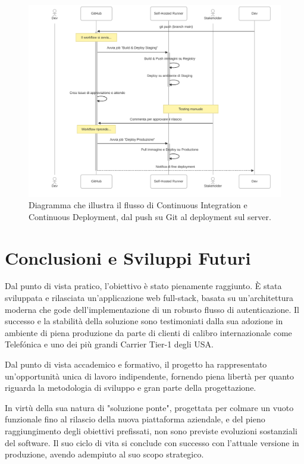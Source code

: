 \documentclass[12pt,a4paper,openright,twoside]{book}
\begin{document}
\begin{figure}[htbp]
    \centering
    \includegraphics[width=\textwidth]{figures/pipeline_sequence.pdf}
    \caption{Diagramma che illustra il flusso di Continuous Integration e Continuous Deployment, dal push su Git al deployment sul server.}
    \label{fig:ci_cd_diagram}
\end{figure}
\FloatBarrier


\chapter{Conclusioni e Sviluppi Futuri}
\label{chap:conclusioni}

Dal punto di vista pratico, l'obiettivo è stato pienamente raggiunto. È stata sviluppata e rilasciata un'applicazione web full-stack, basata su un'architettura moderna che gode dell'implementazione di un robusto flusso di autenticazione. Il successo e la stabilità della soluzione sono testimoniati dalla sua adozione in ambiente di piena produzione da parte di clienti di calibro internazionale come Telefónica e uno dei più grandi Carrier Tier-1 degli USA.

Dal punto di vista accademico e formativo, il progetto ha rappresentato un'opportunità unica di lavoro indipendente, fornendo piena libertà per quanto riguarda la metodologia di sviluppo e gran parte della progettazione.

In virtù della sua natura di "soluzione ponte", progettata per colmare un vuoto funzionale fino al rilascio della nuova piattaforma aziendale, e del pieno raggiungimento degli obiettivi prefissati, non sono previste evoluzioni sostanziali del software. Il suo ciclo di vita si conclude con successo con l'attuale versione in produzione, avendo adempiuto al suo scopo strategico.
\end{document}
